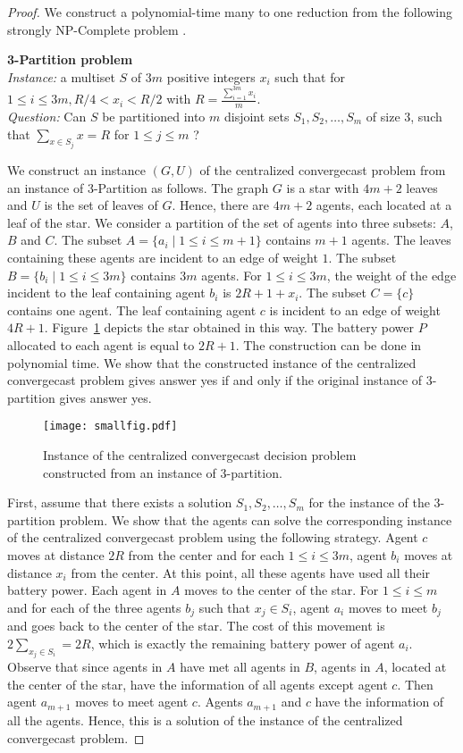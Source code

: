 \documentclass{article}
\newcommand{\probleme}[3]{\medskip\noindent\textbf{#1 problem}\\ \noindent \emph{Instance: }#2\\ \noindent \emph{Question: }#3\medskip}
\newcommand\strat{\mbox{strategy}\xspace}
\newcommand\convergecast{convergecast\xspace}
\newcommand\cccast{centralized convergecast\xspace}
\begin{document}
\begin{proof}
We construct a polynomial-time many to one reduction from the following strongly NP-Complete problem \cite{GJ79}.

\probleme{3-Partition}{a multiset $S$ of $3 m$ positive integers $x_i$
  such that for $1\leq i\leq 3m, R/4<x_i<R/2$ with
  $R=\frac{\sum_{i=1}^{3m}x_i}{m}$.}{Can $S$ be partitioned into $m$
  disjoint sets $S_1, S_2,\dots,S_m$ of size 3, such that $\sum_{x\in S_j}x=R$ for
  $1\leq j\leq m$ ?}

We construct an instance $(G,U)$ of the {\cccast} problem from an instance of 3-Partition as follows. The graph $G$ is a star with $4m+2$ leaves and $U$ is the set of leaves of $G$. Hence, there are $4m+2$ agents, each located at a leaf of the star.
We consider a partition of the set of agents into three subsets: $A$, $B$ and $C$. The subset $A=\{a_i\mid 1\leq i\leq m+1\}$ contains $m+1$ agents. The leaves containing these agents are incident to an edge of weight $1$. The subset $B=\{b_i\mid 1\leq i\leq 3m\}$ contains $3m$ agents. For  $1\leq i\leq 3m$, the weight of the edge incident to the leaf containing agent $b_i$ is $2R+1+x_i$. The subset $C=\{c\}$ contains one agent. The leaf containing agent $c$ is incident to an edge of weight $4R+1$. Figure~\ref{fig:reduc} depicts the star obtained in this way. The battery power $P$ allocated to each agent is equal to $2R+1$. The construction can be done in polynomial time. We show that the constructed instance of the {\cccast} problem gives answer yes if and only if the original instance of 3-partition gives answer yes.

\begin{figure}[h]
\centering
\texttt{[image: smallfig.pdf]}
\caption{Instance of the {\cccast} decision problem constructed from an instance of 3-partition.}
\label{fig:reduc}
\end{figure}

First, assume that there exists a solution $S_1, S_2,\dots,S_m$ for the instance of the 3-partition problem. We show that the agents can solve the corresponding instance of the centralized {\convergecast} problem using the following {\strat}. Agent $c$ moves at distance $2R$ from the center and for each $1\leq i\leq 3m$, agent $b_i$ moves at distance $x_i$ from the center. At this point, all these agents have used all their battery power. Each agent in $A$ moves to the center of the star. For $1\leq i\leq m$ and for each of the three agents $b_j$ such that $x_j\in S_i$, agent $a_i$ moves to meet $b_j$ and goes back to the center of the star. The cost of this movement is $2\sum_{x_j\in S_i}=2R$, which is exactly the remaining battery power of agent $a_i$. Observe that since agents in $A$ have met all agents in $B$, agents in $A$, located at the center of the star, have the information of all agents except agent $c$. Then agent $a_{m+1}$ moves to meet agent $c$. 
Agents $a_{m+1}$ and $c$ have the information of all the agents. Hence, this is a solution of the instance of the {\cccast} problem.


\end{proof}
\end{document}
